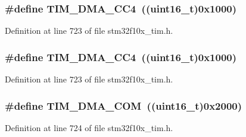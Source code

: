 \subsubsection[{\texorpdfstring{T\+I\+M\+\_\+\+D\+M\+A\+\_\+\+C\+C4}{TIM_DMA_CC4}}]{\setlength{\rightskip}{0pt plus 5cm}\#define T\+I\+M\+\_\+\+D\+M\+A\+\_\+\+C\+C4~(({\bf uint16\+\_\+t})0x1000)}\hypertarget{group___t_i_m___d_m_a__sources_ga59495cf79894dfe5e5b2029863aed956}{}\label{group___t_i_m___d_m_a__sources_ga59495cf79894dfe5e5b2029863aed956}


Definition at line 723 of file stm32f10x\+\_\+tim.\+h.

\subsubsection[{\texorpdfstring{T\+I\+M\+\_\+\+D\+M\+A\+\_\+\+C\+C4}{TIM_DMA_CC4}}]{\setlength{\rightskip}{0pt plus 5cm}\#define T\+I\+M\+\_\+\+D\+M\+A\+\_\+\+C\+C4~(({\bf uint16\+\_\+t})0x1000)}\hypertarget{group___t_i_m___d_m_a__sources_ga59495cf79894dfe5e5b2029863aed956}{}\label{group___t_i_m___d_m_a__sources_ga59495cf79894dfe5e5b2029863aed956}


Definition at line 723 of file stm32f10x\+\_\+tim.\+h.

\subsubsection[{\texorpdfstring{T\+I\+M\+\_\+\+D\+M\+A\+\_\+\+C\+OM}{TIM_DMA_COM}}]{\setlength{\rightskip}{0pt plus 5cm}\#define T\+I\+M\+\_\+\+D\+M\+A\+\_\+\+C\+OM~(({\bf uint16\+\_\+t})0x2000)}\hypertarget{group___t_i_m___d_m_a__sources_gac5f4c56e944bda8ba0c23b97275020ba}{}\label{group___t_i_m___d_m_a__sources_gac5f4c56e944bda8ba0c23b97275020ba}


Definition at line 724 of file stm32f10x\+\_\+tim.\+h.

